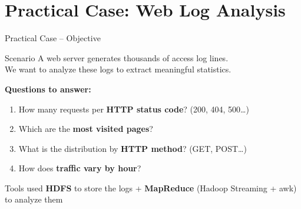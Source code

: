 \documentclass[aspectratio=169, 11pt]{beamer}
\begin{document}
\section{Practical Case: Web Log Analysis}

\begin{frame}{Practical Case -- Objective}
  \begin{block}{Scenario}
    A web server generates thousands of access log lines.\\
    We want to analyze these logs to extract meaningful statistics.
  \end{block}

  \vspace{0.5em}

  \textbf{Questions to answer:}
  \begin{enumerate}
    \item How many requests per \textbf{HTTP status code}? (200, 404, 500\ldots)
    \item Which are the \textbf{most visited pages}?
    \item What is the distribution by \textbf{HTTP method}? (GET, POST\ldots)
    \item How does \textbf{traffic vary by hour}?
  \end{enumerate}

  \vspace{0.5em}

  \begin{exampleblock}{Tools used}
    \textbf{HDFS} to store the logs \quad + \quad \textbf{MapReduce} (Hadoop Streaming + awk) to analyze them
  \end{exampleblock}
\end{frame}
\end{document}
